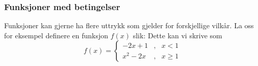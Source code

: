 \subsubsection{Funksjoner med betingelser}
Funksjoner kan gjerne ha flere uttrykk som gjelder for forskjellige vilkår. La oss for eksempel definere en funksjon $ f(x) $ slik:
Dette kan vi skrive som
\begin{equation}f(x)= \left\lbrace{
		\begin{array}{rcr}
			-2x+1 &,&x<1 \\
			x^2-2x   &,& x\geq 1
		\end{array}
	}\right. 
\end{equation}

